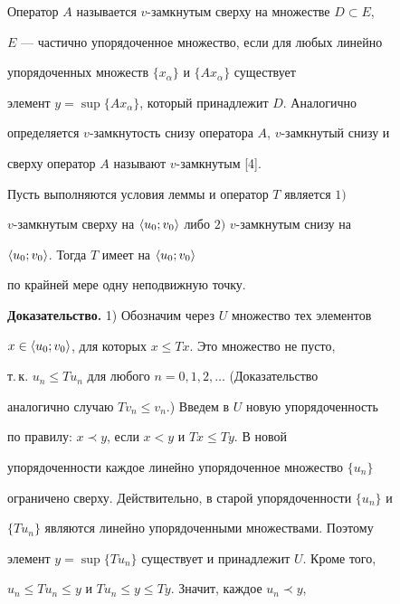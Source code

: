 \begin{defn} 


Оператор $A$ называется $v$-замкнутым сверху на множестве $D\subset E$, 


$E$ --- частично упорядоченное множество, если для любых линейно 


упорядоченных множеств $\{x_\alpha\}$ и $\{Ax_\alpha\}$ существует 


элемент $y=\sup\{Ax_\alpha\}$, который принадлежит $D$. Аналогично 


определяется $v$-замкнутость снизу оператора $A$, $v$-замкнутый снизу и 


сверху оператор $A$ называют $v$-замкнутым [4]. 


\end{defn} 


 


\begin{thm} 


Пусть выполняются условия леммы и оператор $T$ является $1)$ 


$v$-замкнутым сверху на $\langle u_0;v_0\rangle$ либо $2)$ $v$-замкнутым снизу на 


$\langle u_0;v_0\rangle$. Тогда $T$ имеет на $\langle u_0;v_0\rangle$ 


по крайней мере одну неподвижную точку. 


\end{thm} 


 


{\bf Доказательство.} 1) Обозначим через $U$ множество тех элементов 


$x\in\langle u_0;v_0\rangle$, для которых $x\le T x$. Это множество не пусто, 


т.\,к. $u_n\le T u_n$ для любого $n=0,1,2,\dotsc$ (Доказательство 


аналогично случаю $T v_n\le v_n$.) Введем в $U$ новую упорядоченность 


по правилу: $x\prec y$, если $x<y$ и $T x\le T y$. В новой 


упорядоченности каждое линейно упорядоченное множество $\{u_n\}$ 


ограничено сверху. Действительно, в старой упорядоченности $\{u_n\}$ и 


$\{T u_n\}$ являются линейно упорядоченными множествами. Поэтому 


элемент $y=\sup\{T u_n\}$ существует и принадлежит $U$. Кроме того, 


$u_n\le T u_n\le y$ и $T u_n\le y\le T y$. Значит, каждое $u_n\prec y$, 


